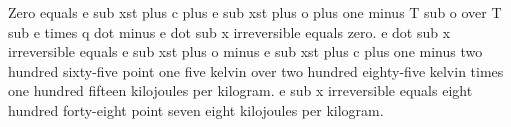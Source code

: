 Zero equals e sub xst plus c plus e sub xst plus o plus one minus T sub o over T sub e times q dot minus e dot sub x irreversible equals zero.  
e dot sub x irreversible equals e sub xst plus o minus e sub xst plus c plus one minus two hundred sixty-five point one five kelvin over two hundred eighty-five kelvin times one hundred fifteen kilojoules per kilogram.  
e sub x irreversible equals eight hundred forty-eight point seven eight kilojoules per kilogram.